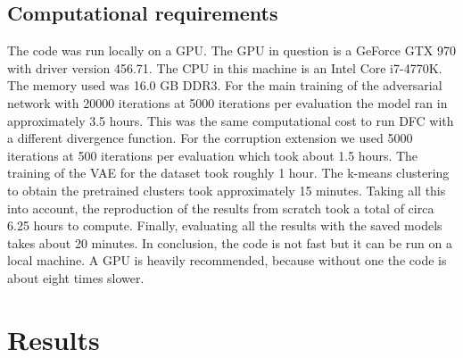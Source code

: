 \subsection{Computational requirements}

The code was run locally on a GPU. The GPU in question is a GeForce GTX 970 with driver version 456.71. The CPU in this machine is an Intel Core i7-4770K. The memory used was 16.0 GB DDR3. For the main training of the adversarial network with 20000 iterations at 5000 iterations per evaluation the model ran in approximately 3.5 hours. This was the same computational cost to run DFC with a different divergence function. For the corruption extension we used 5000 iterations at 500 iterations per evaluation which took about 1.5 hours. The training of the VAE for the \revMNIST dataset took roughly 1 hour. The k-means clustering to obtain the pretrained clusters took approximately 15 minutes. Taking all this into account, the reproduction of the \revMNIST results from scratch took a total of circa 6.25 hours to compute. Finally, evaluating all the results with the saved models takes about 20 minutes. In conclusion, the code is not fast but it can be run on a local machine. A GPU is heavily recommended, because without one the code is about eight times slower.

\section{Results}


\label{sec:results}


